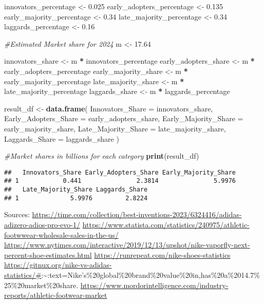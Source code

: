 \documentclass[
]{article}
\newenvironment{Shaded}{\begin{snugshade}}{\end{snugshade}}
\newcommand{\AttributeTok}[1]{\textcolor[rgb]{0.13,0.29,0.53}{#1}}
\newcommand{\CommentTok}[1]{\textcolor[rgb]{0.56,0.35,0.01}{\textit{#1}}}
\newcommand{\FloatTok}[1]{\textcolor[rgb]{0.00,0.00,0.81}{#1}}
\newcommand{\FunctionTok}[1]{\textcolor[rgb]{0.13,0.29,0.53}{\textbf{#1}}}
\newcommand{\NormalTok}[1]{#1}
\newcommand{\OtherTok}[1]{\textcolor[rgb]{0.56,0.35,0.01}{#1}}
\newcommand{\SpecialCharTok}[1]{\textcolor[rgb]{0.81,0.36,0.00}{\textbf{#1}}}
\begin{document}
\begin{Shaded}
\begin{Highlighting}[]
\NormalTok{innovators\_percentage }\OtherTok{\textless{}{-}} \FloatTok{0.025}
\NormalTok{early\_adopters\_percentage }\OtherTok{\textless{}{-}} \FloatTok{0.135}
\NormalTok{early\_majority\_percentage }\OtherTok{\textless{}{-}} \FloatTok{0.34}
\NormalTok{late\_majority\_percentage }\OtherTok{\textless{}{-}} \FloatTok{0.34}
\NormalTok{laggards\_percentage }\OtherTok{\textless{}{-}} \FloatTok{0.16}

\CommentTok{\#Estimated Market share for 2024}
\NormalTok{m }\OtherTok{\textless{}{-}} \FloatTok{17.64}

\NormalTok{innovators\_share }\OtherTok{\textless{}{-}}\NormalTok{ m }\SpecialCharTok{*}\NormalTok{ innovators\_percentage}
\NormalTok{early\_adopters\_share }\OtherTok{\textless{}{-}}\NormalTok{ m }\SpecialCharTok{*}\NormalTok{ early\_adopters\_percentage}
\NormalTok{early\_majority\_share }\OtherTok{\textless{}{-}}\NormalTok{ m }\SpecialCharTok{*}\NormalTok{ early\_majority\_percentage}
\NormalTok{late\_majority\_share }\OtherTok{\textless{}{-}}\NormalTok{ m }\SpecialCharTok{*}\NormalTok{ late\_majority\_percentage}
\NormalTok{laggards\_share }\OtherTok{\textless{}{-}}\NormalTok{ m }\SpecialCharTok{*}\NormalTok{ laggards\_percentage}

\NormalTok{result\_df }\OtherTok{\textless{}{-}} \FunctionTok{data.frame}\NormalTok{(}
  \AttributeTok{Innovators\_Share =}\NormalTok{ innovators\_share,}
  \AttributeTok{Early\_Adopters\_Share =}\NormalTok{ early\_adopters\_share,}
  \AttributeTok{Early\_Majority\_Share =}\NormalTok{ early\_majority\_share,}
  \AttributeTok{Late\_Majority\_Share =}\NormalTok{ late\_majority\_share,}
  \AttributeTok{Laggards\_Share =}\NormalTok{ laggards\_share}
\NormalTok{)}

\CommentTok{\#Market shares in billions for each category}
\FunctionTok{print}\NormalTok{(result\_df)}
\end{Highlighting}
\end{Shaded}

\begin{verbatim}
##   Innovators_Share Early_Adopters_Share Early_Majority_Share
## 1            0.441               2.3814               5.9976
##   Late_Majority_Share Laggards_Share
## 1              5.9976         2.8224
\end{verbatim}

Sources:
\url{https://time.com/collection/best-inventions-2023/6324416/adidas-adizero-adios-pro-evo-1/}
\url{https://www.statista.com/statistics/240975/athletic-footwwear-wholesale-sales-in-the-us/}
\url{https://www.nytimes.com/interactive/2019/12/13/upshot/nike-vaporfly-next-percent-shoe-estimates.html}
\url{https://runrepeat.com/nike-shoes-statistics}
\url{https://gitnux.org/nike-vs-adidas-statistics/\#}:\textasciitilde:text=Nike's\%20global\%20brand\%20value\%20in,has\%20a\%2014.7\%25\%20market\%20share.
\url{https://www.mordorintelligence.com/industry-reports/athletic-footwear-market}
\end{document}
